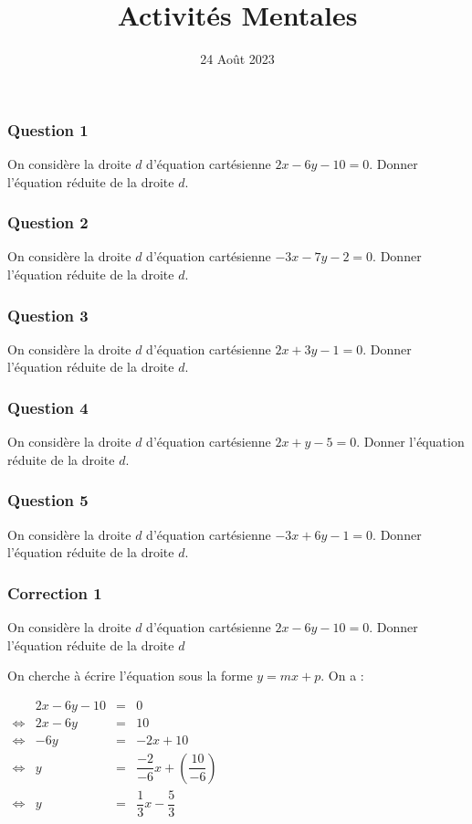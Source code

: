 \documentclass[15pt, mathserif]{beamer}
\title{Activités Mentales}
\date{24 Août 2023}
\begin{document}
\begin{frame}
    \titlepage
\end{frame}

\begin{frame} 
	\frametitle{Question 1}
On considère la droite $d$ d'équation cartésienne $2x-6y-10=0$. Donner l'équation réduite de la droite $d$.\end{frame}


\begin{frame} 
	\frametitle{Question 2}
On considère la droite $d$ d'équation cartésienne $-3x-7y-2=0$. Donner l'équation réduite de la droite $d$.\end{frame}


\begin{frame} 
	\frametitle{Question 3}
On considère la droite $d$ d'équation cartésienne $2x+3y-1=0$. Donner l'équation réduite de la droite $d$.\end{frame}


\begin{frame} 
	\frametitle{Question 4}
On considère la droite $d$ d'équation cartésienne $2x+y-5=0$. Donner l'équation réduite de la droite $d$.\end{frame}


\begin{frame} 
	\frametitle{Question 5}
On considère la droite $d$ d'équation cartésienne $-3x+6y-1=0$. Donner l'équation réduite de la droite $d$.\end{frame}


\begin{frame}
\vspace{-10mm}
	\frametitle{Correction 1}
On considère la droite $d$ d'équation cartésienne $2x-6y-10=0$. Donner l'équation réduite de la droite $d$ 
 
  \bigskip 
 
 On cherche à écrire l'équation sous la forme $y=mx+p$. On a : 
 
 \hfil $\begin{array}{crcl} 
 & 2x-6y-10&=&0 \\ 
 \Leftrightarrow & 2x-6y & =&10\\ 
 \Leftrightarrow & -6y &=&-2x+10\\ 
 \Leftrightarrow & y &=& \dfrac{-2}{-6}x +\left( \dfrac{10}{-6} \right)\\ 
 \Leftrightarrow & y &=&\dfrac{1}{3}x -\dfrac{5}{3}\end{array}$ 
 
 \end{frame}
\end{document}
